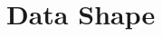 \documentclass{turabian-thesis}
\begin{document}
























\section{Data Shape}
\end{document}
